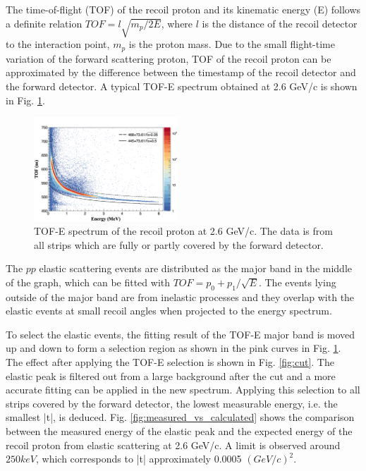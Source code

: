\documentclass[number,5p]{elsarticle}
\begin{document}
The time-of-flight (TOF) of the recoil proton and its kinematic energy (E)
follows a definite relation $TOF = l\sqrt{m_p/2E}$, where $l$ is the distance of
the recoil detector to the interaction point, $m_p$ is the proton mass.
Due to the small flight-time variation of the forward scattering proton, TOF of the recoil proton can be approximated by the difference
between the timestamp of the recoil detector and the forward detector.
A typical TOF-E spectrum obtained at 2.6 GeV/c is shown in Fig. \ref{fig:tof-e}. 
\begin{figure}[h!]
  \centering
  \includegraphics[width=0.48\textwidth]{./tof_e_cut.png}
  \caption{
    TOF-E spectrum of the recoil proton at 2.6 GeV/c. The data is from all strips which are fully or partly covered by the forward detector.}
  \label{fig:tof-e}
\end{figure}
The $pp$ elastic scattering events are distributed as the major band in the
middle of the graph, which can be fitted with \(TOF = p_{0} + p_{1}/{\sqrt{E}}\).
The events lying outside of the major band are from inelastic processes and
they overlap with the elastic events at small recoil angles when projected to the energy spectrum.

To select the elastic events, the fitting result of the TOF-E major band is moved up and down to form a selection region as shown in the pink curves in Fig. \ref{fig:tof-e}.
The effect after applying the TOF-E selection is shown in Fig. \ref{fig:cut}.
The elastic peak is filtered out from a large background after the cut and a more accurate fitting can be applied in the new spectrum.
Applying this selection to all strips covered by the forward detector, the lowest measurable energy, i.e. the smallest |t|, is deduced.
Fig. \ref{fig:measured_vs_calculated} shows the comparison between the measured
energy of the elastic peak and the expected energy of the recoil proton from elastic scattering at 2.6 GeV/c.
A limit is observed around \(250 keV\), which corresponds to |t| approximately 0.0005 \((GeV/c)^2\).
\end{document}
